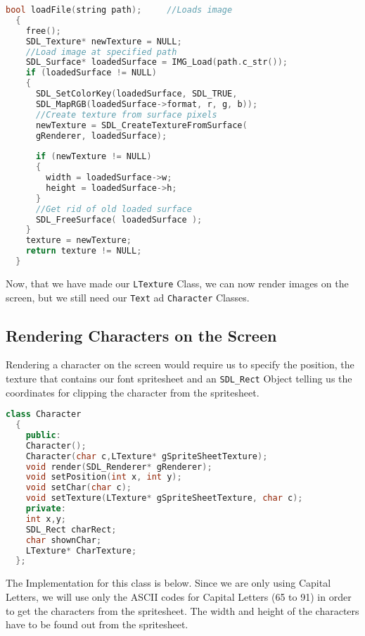 \documentclass[11pt,fleqn]{book} %
\begin{document}
\begin{lstlisting}[language=C++, caption={Use of Array of Pointers and Destructors}]
  bool loadFile(string path);     //Loads image
  {
    free();
    SDL_Texture* newTexture = NULL;
    //Load image at specified path
    SDL_Surface* loadedSurface = IMG_Load(path.c_str());
    if (loadedSurface != NULL)
    {
      SDL_SetColorKey(loadedSurface, SDL_TRUE,
      SDL_MapRGB(loadedSurface->format, r, g, b));
      //Create texture from surface pixels
      newTexture = SDL_CreateTextureFromSurface( 
      gRenderer, loadedSurface);
      
      if (newTexture != NULL)
      {
        width = loadedSurface->w;
        height = loadedSurface->h;
      }
      //Get rid of old loaded surface
      SDL_FreeSurface( loadedSurface );
    }
    texture = newTexture;
    return texture != NULL;
  }
\end{lstlisting}

Now, that we have made our \texttt{LTexture} Class, we can now render images on the screen, but we still need our \texttt{Text} ad \texttt{Character} Classes.

\subsection{Rendering Characters on the Screen}

Rendering a character on the screen would require us to specify the position, the texture that contains our font spritesheet and an \texttt{SDL\_Rect} Object telling us the coordinates for clipping the character from the spritesheet.

\begin{lstlisting}[language=C++, caption={Use of Array of Pointers and Destructors}]
  class Character
  {
    public:
    Character();
    Character(char c,LTexture* gSpriteSheetTexture);
    void render(SDL_Renderer* gRenderer);
    void setPosition(int x, int y);
    void setChar(char c);
    void setTexture(LTexture* gSpriteSheetTexture, char c);
    private:
    int x,y;
    SDL_Rect charRect;
    char shownChar;
    LTexture* CharTexture;
  };
\end{lstlisting}

The Implementation for this class is below. Since we are only using Capital Letters, we will use only the ASCII codes for Capital Letters (65 to 91) in order to get the characters from the spritesheet. The width and height of the characters have to be found out from the spritesheet.
\end{document}
